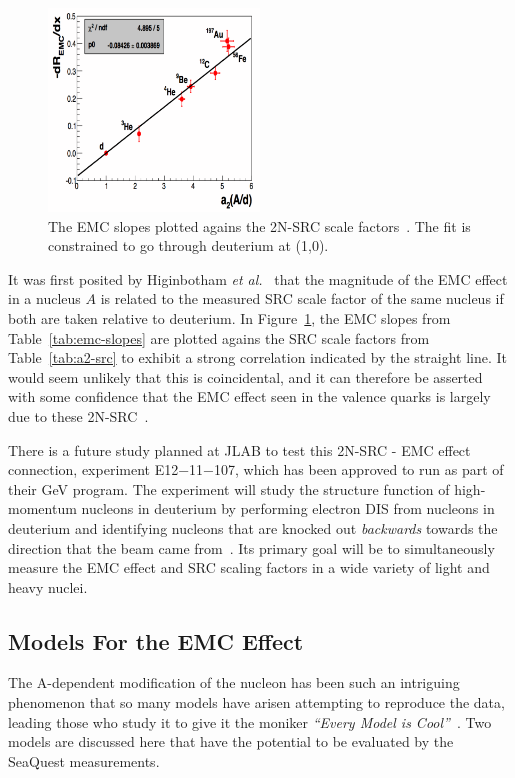 \begin{figure}
	\centering
	\includegraphics[width=0.5\textwidth]{figures/background/emc-a2.png}
	\caption{The EMC slopes plotted agains the 2N-SRC scale factors~\cite{Hen:2012fm}. The fit is constrained to go through deuterium at (1,0).}
	\label{fig:emc-a2}
\end{figure}
It was first posited by Higinbotham \emph{et al.}~\cite{Higinbotham:2010ye} that the magnitude of the EMC effect in a nucleus $A$ is related to the measured SRC scale factor of the same nucleus if both are taken relative to deuterium. In Figure~\ref{fig:emc-a2}, the EMC slopes from Table~\ref{tab:emc-slopes} are plotted agains the SRC scale factors from Table~\ref{tab:a2-src} to exhibit a strong correlation indicated by the straight line. It would seem unlikely that this is coincidental, and it can therefore be asserted with some confidence that the EMC effect seen in the valence quarks is largely due to these 2N-SRC~\cite{Rith:2014tma}.

There is a future study planned at JLAB to test this 2N-SRC - EMC effect connection, experiment E12−11−107, which has been approved to run as part of their \unit[12]{GeV} program. The experiment will study the structure function of high-momentum nucleons in deuterium by performing electron DIS from nucleons in deuterium and identifying nucleons that are knocked out \emph{backwards} towards the direction that the beam came from~\cite{Hen:2014vua}. Its primary goal will be to simultaneously measure the EMC effect and SRC scaling factors in a wide variety of light and heavy nuclei.

\subsection{Models For the EMC Effect}

The A-dependent modification of the nucleon has been such an intriguing phenomenon that so many models have arisen attempting to reproduce the data, leading those who study it to give it the moniker \emph{``Every Model is Cool''}~\cite{Miller:1988hj}. Two models are discussed here that have the potential to be evaluated by the SeaQuest measurements.

